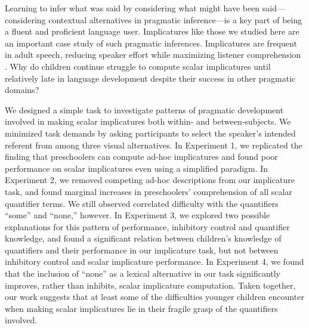 \documentclass[man]{apa2}
\begin{document}

Learning to infer what was said by considering what might have been said---considering contextual alternatives in pragmatic inference---is a key part of being a fluent and proficient language user. Implicatures like those we studied here are an important case study of such pragmatic inferences. Implicatures are frequent in adult speech, reducing speaker effort while maximizing listener comprehension \cite{grice1975,horn1984}. Why do children continue struggle to compute scalar implicatures until relatively late in language development despite their success in other pragmatic domains?

We designed a simple task to investigate patterns of pragmatic development involved in making scalar implicatures both within- and between-subjects. We minimized task demands by asking participants to select the speaker's intended referent from among three visual alternatives. In Experiment 1, we replicated the finding that preschoolers can compute ad-hoc implicatures \cite{stiller2015} and found poor performance on scalar implicatures even using a simplified paradigm. In Experiment 2, we removed competing ad-hoc descriptions from our implicature task, and found marginal increases in preschoolers' comprehension of all scalar quantifier terms. We still observed correlated difficulty with the quantifiers ``some'' and ``none,'' however. In Experiment 3, we explored two possible explanations for this pattern of performance, inhibitory control and quantifier knowledge, and found a significant relation between children's knowledge of quantifiers and their performance in our implicature task, but not between inhibitory control and scalar implicature performance. In Experiment 4, we found that the inclusion of ``none'' as a lexical alternative in our task significantly improves, rather than inhibits, scalar implicature computation. Taken together, our work suggests that at least some of the difficulties younger children encounter when making scalar implicatures lie in their fragile grasp of the quantifiers involved.
\end{document}
